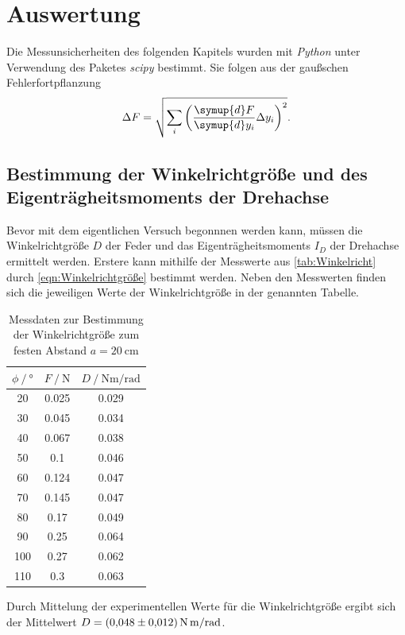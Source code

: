 \section{Auswertung}
\label{sec:Auswertung}
Die Messunsicherheiten des folgenden Kapitels wurden mit \textit{Python} unter Verwendung des Paketes \textit{scipy} \cite{scipy} bestimmt. Sie folgen aus der gaußschen
Fehlerfortpflanzung
\begin{equation}
  \label{eqn:Gauss}
  \Delta F = \sqrt{\sum_i\left(\frac{\symup{d}F}{\symup{d}y_i}\Delta y_i \right)^2}.
\end{equation} 

\subsection{Bestimmung der Winkelrichtgröße und des Eigenträgheitsmoments der Drehachse}
\label{subsec:A_Apparatenkonstanten}
Bevor mit dem eigentlichen Versuch begonnnen werden kann, müssen die Winkelrichtgröße $D$ der Feder und das Eigenträgheitsmoments $I_D$ der Drehachse ermittelt werden. 
Erstere kann mithilfe der Messwerte aus \autoref{tab:Winkelricht} durch \autoref{eqn:Winkelrichtgröße} bestimmt werden. Neben den Messwerten finden sich die jeweiligen 
Werte der Winkelrichtgröße in der genannten Tabelle.
\begin{table}
  \centering
  \caption{Messdaten zur Bestimmung der Winkelrichtgröße zum festen Abstand $a = \qty{20}{\centi\metre}$}
  \label{tab:Winkelricht}
  \begin{tabular}{S[table-format = 3.0] S[table-format = 1.3] S}
    \toprule
    {$\phi \mathbin{/} °$} & {$F \mathbin{/} \unit{\newton}$} & {$D \mathbin{/} \unit{\newton\metre\per\radian}$} \\
     & 0.025 & 0.029 \\
     30 & 0.045 & 0.034 \\
     40 & 0.067 & 0.038 \\
     50 & 0.1   & 0.046 \\
     60 & 0.124 & 0.047 \\
     70 & 0.145 & 0.047 \\
     80 & 0.17  & 0.049 \\
     90 & 0.25  & 0.064 \\
    100 & 0.27  & 0.062 \\
    110 & 0.3   & 0.063 \\
    \bottomrule
  \end{tabular}
\end{table}
Durch Mittelung der experimentellen Werte für die Winkelrichtgröße ergibt sich der Mittelwert $D = \qty{0.048 +- 0.012}{\newton\metre\per\radian}$.

